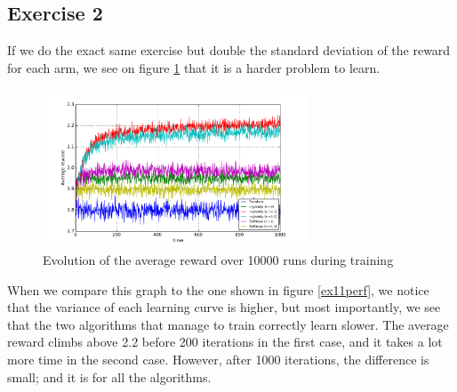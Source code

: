 \documentclass[a4paper]{article}
\begin{document}
\subsection{Exercise 2}
If we do the exact same exercise but double the standard deviation of the reward
for each arm, we see on figure \ref{ex12perf} that it is a harder problem to 
learn.
\begin{figure}[H]
	\centering
	\includegraphics[width=0.7\textwidth]{./fig/ex1-2.pdf}
	\caption{Evolution of the average reward over 10000 runs during training}
	\label{ex12perf}
\end{figure}
When we compare this graph to the one shown in figure \ref{ex11perf}, we
notice that the variance of each learning curve is higher, but most importantly,
we see that the two algorithms that manage to train correctly learn slower. 
The average reward climbs above 2.2 before 200 iterations in the first case,
and it takes a lot more time in the second case. However, after 1000 iterations,
the difference is small; and it is for all the algorithms.\\
\end{document}
